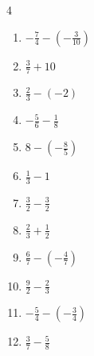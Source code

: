 \begin{multicols}{4}
\begin{enumerate}

  \item $\displaystyle -\frac{7}{4} - \left(-\frac{3}{10}\right)$


  \item $\displaystyle \frac{3}{7} + 10$


\columnbreak %

  \item $\displaystyle \frac{2}{3} - \left(-2\right)$


  \item $\displaystyle -\frac{5}{6} - \frac{1}{8}$


  \item $\displaystyle 8 - \left(-\frac{8}{5}\right)$


  \item $\displaystyle \frac{1}{3} - 1$


  \item $\displaystyle \frac{3}{2} - \frac{3}{2}$

        \phantom{$\displaystyle =0$}

  \item $\displaystyle \frac{2}{3} + \frac{1}{2}$


  \item $\displaystyle \frac{6}{7} - \left(-\frac{4}{7}\right)$


  \item $\displaystyle \frac{9}{2} - \frac{2}{3}$


  \item $\displaystyle -\frac{5}{4} - \left(-\frac{3}{4}\right)$


  \item $\displaystyle \frac{3}{7} - \frac{5}{8}$


\end{enumerate}
\end{multicols}
